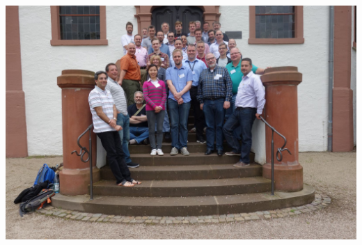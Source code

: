 \documentclass[a4paper,UKenglish]{dagrep}
\begin{document}

\vfill

\begin{center}
\includegraphics[width=1.0\textwidth]{16251.jpg}
\end{center}
\end{document}
